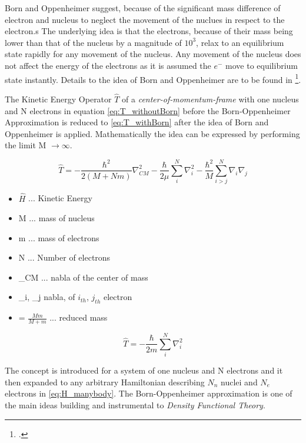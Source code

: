 Born and Oppenheimer suggest, because of the significant mass difference of electron and nucleus to neglect the movement of the nuclues in respect to the electron.s The underlying idea is that the electrons, because of their mass being lower than that of the nucleus by a magnitude of $10^3$, relax to an equilibrium state rapidly for any movement of the nucleus. Any movement of the nucleus does not affect the energy of the electrons as it is assumed the $e^-$ move to equilibrium state instantly. Details to the idea of Born and Oppenheimer are to be found in \footcite[272]{hjorth-jensen}.

The Kinetic Energy Operator $\hat{T}$ of a \textit{center-of-momentum-frame} with one nucleus and N electrons in equation \ref{eq:T_withoutBorn} before the Born-Oppenheimer Approximation is reduced to \ref{eq:T_withBorn}  after 
the idea of Born and Oppenheimer is applied. Mathematically the idea can be expressed by performing the limit M $ \to\infty$.

\begin{equation}
	  \hat{T} = -\frac{\hbar^2}{2(M+Nm)} \nabla_{CM}^2
- 
\frac{\hbar}{2\mu}
\sum_{i}^{N} 
\nabla_{i}^2
-
\frac{\hbar^2}{M}
 \sum_{i > j}^{N} 
  \nabla_i  \nabla_j

	\label{eq:T_withoutBorn}
\end{equation}


\begin{itemize}
	\item $ \hat{H }$ ... Kinetic Energy
	\item M ... mass of nucleus
	\item m ... mass of electrons
	\item N ... Number of electrons
	\item \nabla_{CM} ... nabla of the center of mass 
	\item \nabla_i, \nabla_j nabla, of $i_{th}$, $j_{th}$ electron
	\item \mu = $\frac{Mm}{M+m}$ ... reduced mass 
\end{itemize}

\begin{equation}
	  \hat{T} =
- 
\frac{\hbar}{2m}
\sum_{i}^{N} 
\nabla_{i}^2

	\label{eq:T_withBorn}
\end{equation}

The concept is introduced for a system of one nucleus and N electrons and it then expanded to any arbitrary Hamiltonian describing  $N_n$ nuclei and $N_e$ electrons in \ref{eq:H_manybody}. The Born-Oppenheimer approximation is one of the main ideas building and instrumental to \textit{Density Functional Theory}.



